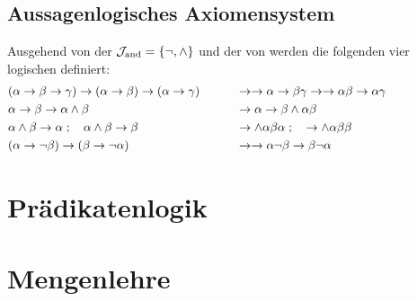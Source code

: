 \subsection{Aussagenlogisches Axiomensystem}%
\label{sub:ausAxiome}

Ausgehend von der  $\mathcal{J}_{\mathrm{and}} = \{\lnot, \land\}$ und der  von \chrqt{$\limp$} werden die folgenden vier logischen  definiert:
\begin{align}
	&
	(\alpha\rightarrow\beta\rightarrow\gamma)\rightarrow(\alpha\rightarrow\beta)\rightarrow(\alpha\rightarrow\gamma)
	&&&& &
	& \rightarrow\rightarrow\alpha\rightarrow\beta\gamma\rightarrow\rightarrow\alpha\beta\rightarrow\alpha\gamma \\
	& \alpha \rightarrow \beta \rightarrow \alpha \land \beta
	&&&& &
	& \rightarrow \alpha \rightarrow \beta \land \alpha \beta \\
	& \alpha \land \beta \rightarrow \alpha \;; \quad \alpha \land \beta \rightarrow \beta
	&&&& &
	& \rightarrow \land \alpha \beta \alpha \;; \quad \rightarrow \land \alpha \beta \beta\\
	&(\alpha \rightarrow \lnot \beta) \rightarrow (\beta \rightarrow \lnot \alpha)
	&&&& &
	& \rightarrow \rightarrow \alpha \lnot \beta \rightarrow \beta \lnot \alpha
	&&&&&&&&&&
\end{align}
%

\section{Prädikatenlogik}%
\label{sec:Prädikatenlogik}


\section{Mengenlehre}%
\label{sec:Mengenlehre}


\Endchapter
